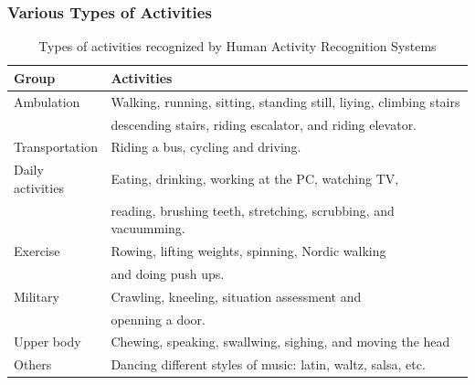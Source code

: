 \documentclass{beamer}
\theoremstyle{definition}
\begin{document}
\begin{frame}
\frametitle{Various Types of Activities}

\begin{table}[h]
\label{t:typesofHAR}
\scriptsize{
\begin{tabular}{|l|l |}
\hline
\textbf{Group }& \textbf{Activities} \\ \hline
Ambulation & Walking, running, sitting, standing still, liying, climbing stairs \\ 
           & descending stairs, riding escalator, and riding elevator. \\ \hline
Transportation & Riding a bus, cycling and driving. \\ \hline
Daily activities & Eating, drinking, working at the PC, watching TV,\\ 
              & reading, brushing teeth, stretching, scrubbing, and vacuumming. \\ \hline
Exercise & Rowing, lifting weights, spinning, Nordic walking \\ 
       & and doing push ups. \\ \hline
Military & Crawling, kneeling, situation assessment and  \\ 
          & openning a door. \\ \hline
Upper body & Chewing, speaking, swallwing, sighing, and moving the head\\ \hline  
Others & Dancing different styles of music: latin, waltz, salsa, etc. \\ \hline  
\end{tabular}}
\caption{Types of activities recognized by Human Activity Recognition
Systems}
\end{table}

\end{frame}
\end{document}
